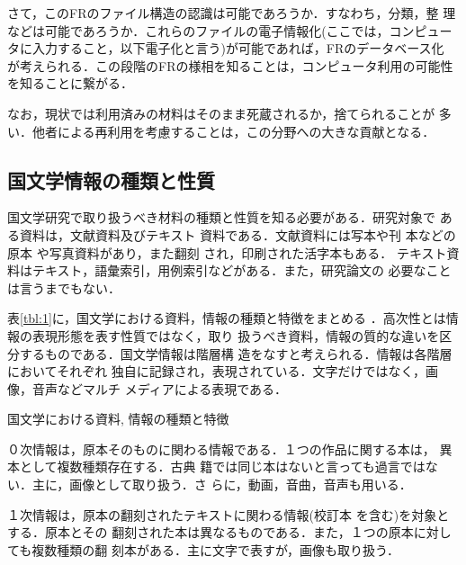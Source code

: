 さて，このFRのファイル構造の認識は可能であろうか．すなわち，分類，整
理などは可能であろうか．これらのファイルの電子情報化(ここでは，コンピュー
タに入力すること，以下電子化と言う)が可能であれば，FRのデータベース化
が考えられる．この段階のFRの様相を知ることは，コンピュータ利用の可能性
を知ることに繋がる．

なお，現状では利用済みの材料はそのまま死蔵されるか，捨てられることが
多い．他者による再利用を考慮することは，この分野への大きな貢献となる．

\subsection{国文学情報の種類と性質}
国文学研究で取り扱うべき材料の種類と性質を知る必要がある．研究対象で
ある資料は，文献資料\setcounter{footnote}{0}\footnotemark 及びテキスト
資料\setcounter{footnote}{0}\footnotemark である．文献資料には写本や刊
本\setcounter{footnote}{0}\footnotemark などの原本
\setcounter{footnote}{0}\footnotemark や写真資料があり，また翻刻
\setcounter{footnote}{0}\footnotemark され，印刷された活字本もある．
テキスト資料はテキスト，語彙索引，用例索引などがある．また，研究論文の
必要なことは言うまでもない．

表\ref{tbl:1}に，国文学における資料，情報の種類と特徴をまとめる
\cite{Yasunaga1989a}．高次性とは情報の表現形態を表す性質ではなく，取り
扱うべき資料，情報の質的な違いを区分するものである．国文学情報は階層構
造をなすと考えられる\cite{Yasunaga1995b}．情報は各階層においてそれぞれ
独自に記録され，表現されている．文字だけではなく，画像，音声などマルチ
メディアによる表現である．

\begin{table}[htb]
\begin{center}
  \caption{国文学における資料, 情報の種類と特徴}\label{tbl:1}
  
\end{center}
\end{table}
\vspace{-1mm}
０次情報は，原本そのものに関わる情報である．１つの作品に関する本は，
異本\setcounter{footnote}{0}\footnotemark として複数種類存在する．古典
籍では同じ本はないと言っても過言ではない．主に，画像として取り扱う．さ
らに，動画，音曲，音声も用いる．

１次情報は，原本の翻刻されたテキストに関わる情報(校訂本
\setcounter{footnote}{0}\footnotemark を含む)を対象とする．原本とその
翻刻された本は異なるものである．また，１つの原本に対しても複数種類の翻
刻本がある．主に文字で表すが，画像も取り扱う．

